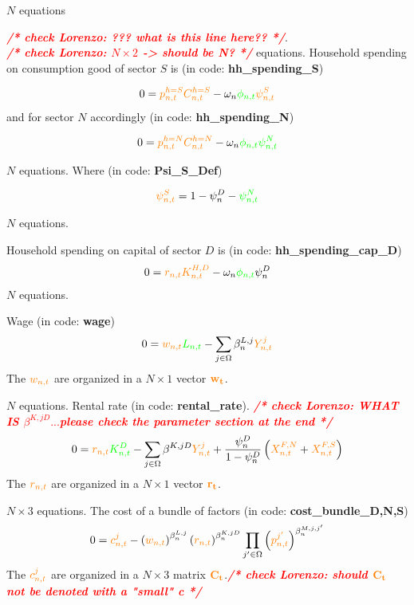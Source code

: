 \documentclass[12pt, bibtotoc, tablecaptionabove, figurecaptionabove, fleqn]{article}
\newcommand{\cl}[1]{{\color{orange}{#1}}}
\newcommand{\st}[1]{{\color{green}{#1}}}
\newcommand{\fixmeLorenzo}[1]{\textbf{\emph{\textcolor{red}{/* check Lorenzo: #1 */}}}}
\begin{document}
\noindent $N$ equations {\fixmeLorenzo{??? what is this line here??}.\\

\noindent \fixmeLorenzo{$N \times 2$ -> should be N?} equations. Household spending on consumption good of sector $S$ is (in code: {\bf{hh\_spending\_S}}) 

\begin{equation}
0 = \cl{p^{h=S}_{n,t}} \cl{C^{h=S}_{n,t}} - \omega_n \st{\phi_{n,t}} \cl{\psi_{n,t}^S}
\end{equation}
and for sector $N$ accordingly (in code: {\bf{hh\_spending\_N}})

\begin{equation}
0 = \cl{p^{h=N}_{n,t}} \cl{C^{h=N}_{n,t}} - \omega_n \st{\phi_{n,t}} \st{\psi_{n,t}^N}
\end{equation}

\noindent $N $ equations. Where (in code: {\bf{Psi\_S\_Def}})

\begin{equation}
\cl{\psi_{n,t}^S} = 1 - \psi^D_n - \st{\psi_{n,t}^N}
\end{equation}

\noindent $N $ equations. 

Household spending on capital of sector $D$ is (in code: {\bf{hh\_spending\_cap\_D}})
\begin{equation}
0 = \cl{r_{n, t}} \cl{K_{n, t}^{H,D}} - \omega_n \st{\phi_{n,t}} \psi^D_n
\end{equation}
\noindent $N $ equations. 

Wage (in code: {\bf{wage}})
\begin{equation}
0 = \cl{w_{n, t}} \st{L_{n, t}} -\sum_{j \in \Omega} \beta_{n}^{L, j} \cl{Y_{n, t}^{j}}
\end{equation}
The $\cl{w_{n,t}}$ are organized in a $ N \times 1$ vector $\mathbf{\cl{w_t}}$.


\noindent $N$ equations. Rental rate  (in code: {\bf{rental\_rate}}). {\fixmeLorenzo{WHAT IS $\beta^{K, j D} ...$please check the parameter section at the end}}
\begin{equation}
  0 = \cl{r_{n, t}} \st{K_{n, t}^{D}}-\sum_{j \in \Omega} \beta^{K, j D} \cl{Y_{n, t}^{j}}+\frac{\psi^{D}_n} { 1-\psi^D_n }\left(\cl{X_{n, t}^{F, N}}+\cl{X_{n, t}^{F, S}}\right)
\end{equation}
The $\cl{r_{n,t}}$ are organized in a $ N \times 1$ vector $\mathbf{\cl{r_t}}$.

\noindent $N \times 3$ equations. The cost of a bundle of factors (in code: {\bf{cost\_bundle\_D,N,S}})
\begin{equation}
0 = \cl{c_{n, t}^{j}}-\left(\cl{w_{n, t}}\right)^{\beta_{n}^{L, j}}\left(\cl{r_{n, t}}\right)^{\beta_{n}^{K, j D}} \prod_{j^{\prime} \in \Omega}\left(\cl{p_{n, t}^{j^{\prime}}}\right)^{\beta_{n}^{M, j,j^{\prime}}}
\end{equation}
The $\cl{c^j_{n,t}}$ are organized in a $ N \times 3$ matrix $\mathbf{\cl{C_t}}$.\fixmeLorenzo{should $\mathbf{\cl{C_t}}$ not be denoted with a "small" c}


}
\end{document}
